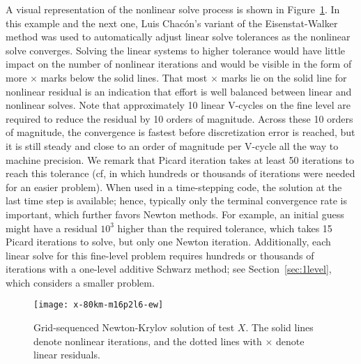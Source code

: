 A visual representation of the nonlinear solve process is shown in Figure~\ref{fig:xgridseq}.
In this example and the next one, Luis Chac\'on's variant of the Eisenstat-Walker~\citep{eisenstat1996cft} method was used to automatically adjust linear solve tolerances as the nonlinear solve converges.  Solving the linear systems to higher tolerance would have little impact on the number of nonlinear iterations and would be visible in the form of more $\times$ marks below the solid lines.  That most $\times$ marks lie on the solid line for nonlinear residual is an indication that effort is well balanced between linear and nonlinear solves.
Note that approximately 10 linear V-cycles on the fine level are required to reduce the residual by 10 orders of magnitude.
Across these 10 orders of magnitude, the convergence is fastest before discretization error is reached, but it is still steady and close to an order of magnitude per V-cycle all the way to machine precision.
We remark that Picard iteration takes at least 50 iterations to reach this tolerance (cf\onedot \citet{desmedt2010using}, in which hundreds or thousands of iterations were needed for an easier problem).
When used in a time-stepping code, the solution at the last time step is available; hence, typically only the terminal convergence rate is important, which further favors Newton methods.
For example, an initial guess might have a residual $10^3$ higher than the required tolerance, which takes 15 Picard iterations to solve, but only one Newton iteration.
Additionally, each linear solve for this fine-level problem requires hundreds or thousands of iterations with a one-level additive Schwarz method; see Section~\ref{sec:1level}, which considers a smaller problem.

\begin{figure}
  \centering\texttt{[image: x-80km-m16p2l6-ew]}
  \caption{Grid-sequenced Newton-Krylov solution of test $X$.  The solid lines denote nonlinear iterations, and the dotted lines with $\times$ denote linear residuals.}\label{fig:xgridseq}
\end{figure}

